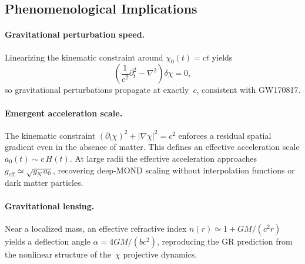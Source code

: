 \subsection{Phenomenological Implications}
  \label{subsec:phenomenology}

  \paragraph{Gravitational perturbation speed.}
    Linearizing the kinematic constraint around
    $\chi_0(t) = ct$ yields
    \begin{equation}
      \left(
        \frac{1}{c^2}\partial_t^2 - \nabla^2
      \right)\delta\chi = 0,
      \label{eq:gw_wave}
    \end{equation}
    so gravitational perturbations propagate at exactly~$c$, consistent
    with GW170817.

  \paragraph{Emergent acceleration scale.}
    The kinematic constraint
    $({\partial_t \chi})^2 + |\nabla\chi|^2 = c^2$ enforces a residual
    spatial gradient even in the absence of matter.
    This defines an effective acceleration scale
    $a_0(t) \sim c\,H(t)$.
    At large radii the effective acceleration approaches
    $g_{\mathrm{eff}} \simeq \sqrt{g_N\,a_0}$, recovering deep-MOND
    scaling without interpolation functions or dark matter particles.

  \paragraph{Gravitational lensing.}
    Near a localized mass, an effective refractive index
    $n(r) \simeq 1 + GM/(c^2 r)$ yields a deflection angle
    $\alpha = 4GM/(bc^2)$, reproducing the GR prediction from the
    nonlinear structure of the~$\chi$ projective dynamics.
